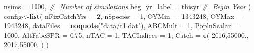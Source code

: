 \documentclass[]{article}
\newenvironment{Shaded}{\begin{snugshade}}{\end{snugshade}}
\newcommand{\CommentTok}[1]{\textcolor[rgb]{0.56,0.35,0.01}{\textit{#1}}}
\newcommand{\DataTypeTok}[1]{\textcolor[rgb]{0.13,0.29,0.53}{#1}}
\newcommand{\DecValTok}[1]{\textcolor[rgb]{0.00,0.00,0.81}{#1}}
\newcommand{\FloatTok}[1]{\textcolor[rgb]{0.00,0.00,0.81}{#1}}
\newcommand{\KeywordTok}[1]{\textcolor[rgb]{0.13,0.29,0.53}{\textbf{#1}}}
\newcommand{\NormalTok}[1]{#1}
\newcommand{\StringTok}[1]{\textcolor[rgb]{0.31,0.60,0.02}{#1}}
\begin{document}
\begin{Shaded}
\begin{Highlighting}[]
  \DataTypeTok{nsims        =} \DecValTok{1000}\NormalTok{, }\CommentTok{\#\_Number of simulations}
  \DataTypeTok{beg\_yr\_label =}\NormalTok{ thisyr  }\CommentTok{\#\_Begin Year}
\NormalTok{)}
\NormalTok{config\textless{}{-}}\KeywordTok{list}\NormalTok{(}
  \DataTypeTok{nFixCatchYrs =} \DecValTok{2}\NormalTok{,}
  \DataTypeTok{nSpecies     =} \DecValTok{1}\NormalTok{,}
  \DataTypeTok{OYMin        =} \FloatTok{.1343248}\NormalTok{,}
  \DataTypeTok{OYMax        =} \DecValTok{1943248}\NormalTok{,}
  \DataTypeTok{dataFiles    =} \KeywordTok{noquote}\NormalTok{(}\StringTok{"data/t1.dat"}\NormalTok{),}
  \DataTypeTok{ABCMult      =} \DecValTok{1}\NormalTok{,}
  \DataTypeTok{PoplnScalar  =} \DecValTok{1000}\NormalTok{,}
  \DataTypeTok{AltFabcSPR   =} \FloatTok{0.75}\NormalTok{,}
  \DataTypeTok{nTAC         =} \DecValTok{1}\NormalTok{,}
  \DataTypeTok{TACIndices   =} \DecValTok{1}\NormalTok{,}
  \DataTypeTok{Catch        =} \KeywordTok{c}\NormalTok{( }\DecValTok{2016}\NormalTok{,}\FloatTok{55000.}\NormalTok{,   }\DecValTok{2017}\NormalTok{,}\FloatTok{55000.}\NormalTok{ )}
\NormalTok{)}
\end{Highlighting}
\end{Shaded}
\end{document}
